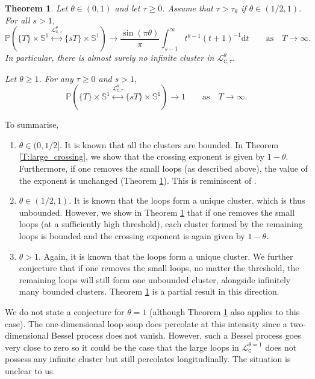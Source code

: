 \documentclass[11pt]{article}
\newtheorem{theorem}{Theorem}[section]
\theoremstyle{remark}
\newcommand{\Lc}{\mathcal{L}}
\newcommand{\Prob}[1]{\mathbb{P} \left( #1 \right) }
\renewcommand{\d}{\mathrm{d}}
\newcommand{\cyl}{\mathtt{C}}
\numberwithin{equation}{section}
\begin{document}
\begin{theorem}\label{T:perco_large_loops}
Let $\theta \in (0,1)$ and let $\tau \geq 0$. Assume that $\tau > \tau_\theta$ if $\theta \in (1/2,1)$.
For all $s > 1$,
\begin{equation}
\label{E:T_perco_large1}
\Prob{ \{T\} \times \mathbb{S}^1 \overset{\Lc_{\cyl,\tau}^\theta}{\longleftrightarrow} \{ s T \} \times \mathbb{S}^1 } \to \frac{\sin(\pi \theta)}{\pi} \int_{s-1}^\infty t^{\theta-1} (t+1)^{-1} \d t
\quad \quad \text{as} \quad T \to \infty.
\end{equation}
In particular, there is almost surely no infinite cluster in $\Lc_{\cyl,\tau}^\theta$.

Let $\theta \geq 1$. For any $\tau \geq 0$ and $s>1$,
\begin{equation}
\label{E:T_perco_large2}
\Prob{ \{T\} \times \mathbb{S}^1 \overset{\Lc_{\cyl,\tau}^\theta}{\longleftrightarrow} \{ s T \} \times \mathbb{S}^1 } \to 1
\quad \quad \text{as} \quad T \to \infty.
\end{equation}
\end{theorem}

To summarise,

\begin{enumerate}
\item
$\theta \in (0,1/2]$. It is known that all the clusters are bounded. 
In Theorem \ref{T:large_crossing}, we show that the crossing exponent is given by $1-\theta$.
Furthermore, if one removes the small loops (as described above), the value of the exponent is unchanged (Theorem \ref{T:perco_large_loops}). This is reminiscent of \cite{Lupu19ConvCLE}.
\item
$\theta \in (1/2,1)$. 
It is known that the loops form a unique cluster,
which is thus unbounded.
However, we show in Theorem \ref{T:perco_large_loops} that if one removes 
the small loops (at a sufficiently high threshold), 
each cluster formed by the remaining loops is bounded and the crossing exponent is again given by $1-\theta$.
\item
$\theta > 1$. Again, it is known that the loops form a unique cluster.
We further conjecture that if one removes the small loops, no matter the threshold, the remaining loops will still form one unbounded cluster, alongside infinitely many bounded clusters. Theorem \ref{T:perco_large_loops} is a partial result in this direction. 
\end{enumerate}

We do not state a conjecture for $\theta = 1$ (although Theorem \ref{T:perco_large_loops} also applies to this case).
The one-dimensional loop soup does percolate at this intensity since a two-dimensional Bessel process does not vanish. However, such a Bessel process goes very close to zero so it could be the case that the large loops in $\Lc_\cyl^{\theta=1}$ does not possess any infinite cluster but still percolates longitudinally. The situation is unclear to us.
\end{document}
